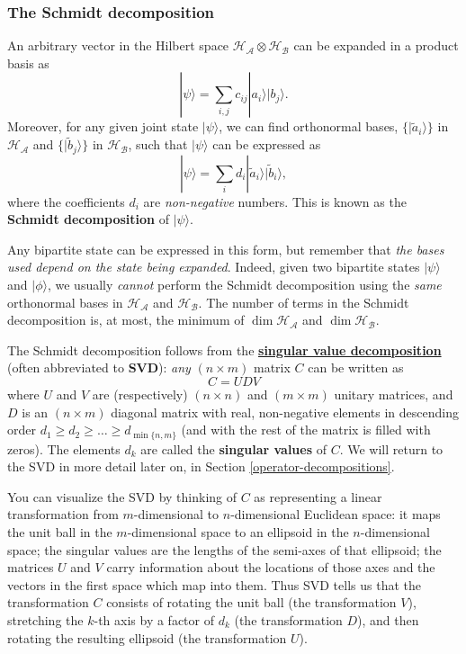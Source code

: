 \documentclass[fleqn,a4paper]{article}
\theoremstyle{definition}
\theoremstyle{definition}
\theoremstyle{definition}
\theoremstyle{definition}
\theoremstyle{remark}
\begin{document}
\hypertarget{the-schmidt-decomposition}{%
\subsubsection{The Schmidt decomposition}\label{the-schmidt-decomposition}}

An arbitrary vector in the Hilbert space \(\mathcal{H}_{\mathcal{A}}\otimes \mathcal{H}_{\mathcal{B}}\) can be expanded in a product basis as
\[
  |\psi\rangle
  = \sum_{i,j} c_{ij}|a_i\rangle|b_j\rangle.
\]
Moreover, for any given joint state \(|\psi\rangle\), we can find orthonormal bases, \(\{|\tilde{a}_i\rangle\}\) in \(\mathcal{H}_{\mathcal{A}}\) and \(\{|\tilde{b}_j\rangle\}\) in \(\mathcal{H}_{\mathcal{B}}\), such that \(|\psi\rangle\) can be expressed as
\[
  |\psi\rangle
  = \sum_{i} d_{i}|\tilde a_i\rangle|\tilde b_i\rangle,
\]
where the coefficients \(d_i\) are \emph{non-negative} numbers.
This is known as the \textbf{Schmidt decomposition} of \(|\psi\rangle\).

Any bipartite state can be expressed in this form, but remember that \emph{the bases used depend on the state being expanded}.
Indeed, given two bipartite states \(|\psi\rangle\) and \(|\phi\rangle\), we usually \emph{cannot} perform the Schmidt decomposition using the \emph{same} orthonormal bases in \(\mathcal{H}_{\mathcal{A}}\) and \(\mathcal{H}_{\mathcal{B}}\).
The number of terms in the Schmidt decomposition is, at most, the minimum of \(\dim\mathcal{H}_{\mathcal{A}}\) and \(\dim\mathcal{H}_{\mathcal{B}}\).

The Schmidt decomposition follows from the \href{https://en.wikipedia.org/wiki/Singular_value_decomposition}{\textbf{singular value decomposition}} (often abbreviated to \textbf{SVD}): \emph{any} \((n\times m)\) matrix \(C\) can be written as
\[
  C = UDV
\]
where \(U\) and \(V\) are (respectively) \((n\times n)\) and \((m\times m)\) unitary matrices, and \(D\) is an \((n\times m)\) diagonal matrix with real, non-negative elements in descending order \(d_1\geqslant d_2\geqslant\ldots\geqslant d_{\min\{n,m\}}\) (and with the rest of the matrix is filled with zeros).
The elements \(d_k\) are called the \textbf{singular values} of \(C\).
We will return to the SVD in more detail later on, in Section \ref{operator-decompositions}.

You can visualize the SVD by thinking of \(C\) as representing a linear
transformation from \(m\)-dimensional to \(n\)-dimensional Euclidean space: it maps the unit ball in the \(m\)-dimensional space to an ellipsoid in
the \(n\)-dimensional space; the singular values are the lengths of
the semi-axes of that ellipsoid; the matrices \(U\) and \(V\) carry
information about the locations of those axes and the vectors in
the first space which map into them.
Thus SVD tells us that the transformation \(C\) consists of rotating the unit ball (the transformation \(V\)), stretching the \(k\)-th axis by a factor of \(d_k\) (the transformation \(D\)), and then rotating the resulting ellipsoid (the transformation \(U\)).
\end{document}
